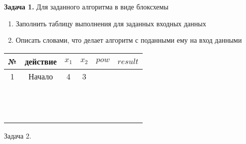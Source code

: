 \documentclass[a4paper,10pt]{article}
\begin{document}
 


\textbf{Задача 1.} Для заданного алгоритма в виде блоксхемы
\begin{enumerate}
 \item Заполнить таблицу выполнения для заданных входных данных
 \item Описать словами, что делает алгоритм с поданными ему на вход данными
\end{enumerate}




\begin{tabular}[c]{c|c|c|c|c|c}
\textbf{№} & \textbf{действие} & $x_1$ & $x_2$ & \textbf{$pow$} & \textbf{$result$}\\\hline
1 & Начало & 4 & 3 & & \\\hline
  &        &   &   & & \\\hline
  &        &   &   & & \\\hline
  &        &   &   & & \\\hline
  &        &   &   & & \\\hline
  &        &   &   & & \\\hline
  &        &   &   & & \\\hline
  &        &   &   & & \\\hline
  &        &   &   & & \\\hline
  &        &   &   & & \\\hline
  &        &   &   & & \\\hline
  &        &   &   & & \\\hline
  &        &   &   & & \\\hline
  &        &   &   & & \\
\end{tabular}


\newpage
Задача 2.

\vspace{\fill}
\newpage
\end{document}
